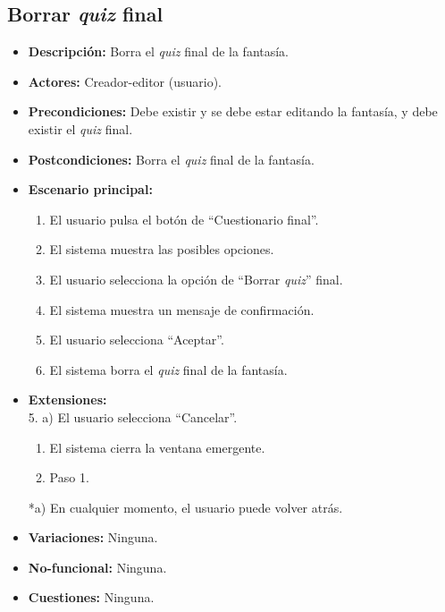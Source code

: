 \subsection{Borrar \textit{quiz} final}
\begin{itemize}
	\item \textbf{Descripción:} Borra el \textit{quiz} final de la fantasía.
	\item \textbf{Actores:} Creador-editor (usuario).
	\item \textbf{Precondiciones:} Debe existir y se debe estar editando la fantasía, y debe existir el \textit{quiz} final.
	\item \textbf{Postcondiciones:} Borra el \textit{quiz} final de la fantasía.
	\item \textbf{Escenario principal:}
	\begin{enumerate}
		\item El usuario pulsa el botón de ``Cuestionario final''.
		\item El sistema muestra las posibles opciones.
		\item El usuario selecciona la opción de ``Borrar \textit{quiz}'' final.
		\item El sistema muestra un mensaje de confirmación.
		\item El usuario selecciona ``Aceptar''.
		\item El sistema borra el \textit{quiz} final de la fantasía.
	\end{enumerate}
	\item \textbf{Extensiones:} \\ 5. a) El usuario selecciona ``Cancelar''.
	\begin{enumerate}
		\item El sistema cierra la ventana emergente.
		\item Paso 1.
	\end{enumerate}
	*a) En cualquier momento, el usuario puede volver atrás.
	\item \textbf{Variaciones:} Ninguna.
	\item \textbf{No-funcional:} Ninguna.
	\item \textbf{Cuestiones:} Ninguna.
\end{itemize}


